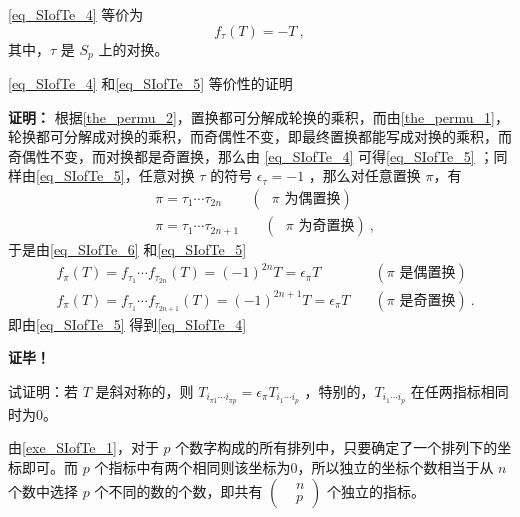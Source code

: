 \autoref{eq_SIofTe_4} 等价为
\begin{equation}\label{eq_SIofTe_5}
f_\tau(T)=-T~,
\end{equation}
其中，$\tau$ 是 $S_p$ 上的对换。
\begin{example}{}
\autoref{eq_SIofTe_4} 和\autoref{eq_SIofTe_5} 等价性的证明

\textbf{证明：}
根据\autoref{the_permu_2}，置换都可分解成轮换的乘积，而由\autoref{the_permu_1}，轮换都可分解成对换的乘积，而奇偶性不变，即最终置换都能写成对换的乘积，而奇偶性不变，而对换都是奇置换，那么由 \autoref{eq_SIofTe_4} 可得\autoref{eq_SIofTe_5} ；同样由\autoref{eq_SIofTe_5}，任意对换 $\tau$ 的符号 $\epsilon_\tau=-1$ ，那么对任意置换 $\pi$，有
\begin{equation}
\begin{aligned}
&\pi=\tau_1\cdots\tau_{2n} \quad &(\text{ $\pi$ 为偶置换})\\
&\pi=\tau_1\cdots\tau_{2n+1} &\quad (\text{ $\pi$ 为奇置换})~,
\end{aligned}
\end{equation}
于是由\autoref{eq_SIofTe_6} 和\autoref{eq_SIofTe_5} 
\begin{equation}
\begin{aligned}
&f_\pi(T)=f_{\tau_1}\cdots f_{\tau_{2n}}(T)=(-1)^{2n}T=\epsilon_\pi T\quad&(\text{$\pi$ 是偶置换})\\
&f_\pi(T)=f_{\tau_1}\cdots f_{\tau_{2n+1}}(T)=(-1)^{2n+1}T=\epsilon_\pi T\quad&(\text{$\pi$ 是奇置换})~.
\end{aligned}
\end{equation}
即由\autoref{eq_SIofTe_5} 得到\autoref{eq_SIofTe_4} 

\textbf{证毕！}

\end{example}






\begin{exercise}{}\label{exe_SIofTe_1}
试证明：若 $T$ 是斜对称的，则 $T_{i_{\pi1}\cdots i_{\pi p}}=\epsilon_\pi T_{i_1\cdots i_p}$ ，特别的，$ T_{i_1\cdots i_p}$ 在任两指标相同时为0。
\end{exercise}

由\autoref{exe_SIofTe_1}，对于 $p$ 个数字构成的所有排列中，只要确定了一个排列下的坐标即可。而 $p$ 个指标中有两个相同则该坐标为0，所以独立的坐标个数相当于从 $n$ 个数中选择 $p$ 个不同的数的个数，即共有 $\left(\begin{aligned}
&n\\
&p
\end{aligned}\right)$
个独立的指标。


